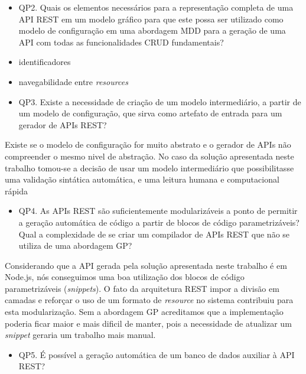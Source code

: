 \begin{itemize}
	\item QP2. Quais os elementos necessários para a representação completa de uma API REST em um modelo gráfico para que este possa ser utilizado como modelo de configuração em uma abordagem MDD para a geração de uma API com todas as funcionalidades CRUD fundamentais?
\end{itemize}

\begin{itemize}
	\item identificadores
	\item navegabilidade entre \textit{resources}
\end{itemize}

\begin{itemize}
	\item QP3. Existe a necessidade de criação de um modelo intermediário, a partir de um modelo de configuração, que sirva como artefato de entrada para um gerador de APIs REST?
\end{itemize}

Existe se o modelo de configuração for muito abstrato e o gerador de APIs não compreender o mesmo nivel de abstração. No caso da solução apresentada neste trabalho tomou-se a decisão de usar um modelo intermediário que possibilitasse uma validação sintática automática, e uma leitura humana e computacional rápida

\begin{itemize}
	\item QP4. As APIs REST são suficientemente modularizáveis a ponto de permitir a geração automática de código a partir de blocos de código parametrizáveis? Qual a complexidade de se criar um compilador de APIs REST que não se utiliza de uma abordagem GP?
\end{itemize}

Considerando que a API gerada pela solução apresentada neste trabalho é em Node.js, nós conseguimos uma boa utilização dos blocos de código parametrizáveis (\textit{snippets}). O fato da arquitetura REST impor a divisão em camadas e reforçar o uso de um formato de \textit{resource} no sistema contribuiu para esta modularização. Sem a abordagem GP acreditamos que a implementação poderia ficar maior e mais dificil de manter, pois a necessidade de atualizar um \textit{snippet} geraria um trabalho mais manual.

\begin{itemize}
	\item QP5. É possível a geração automática de um banco de dados auxiliar à API REST?
\end{itemize}

